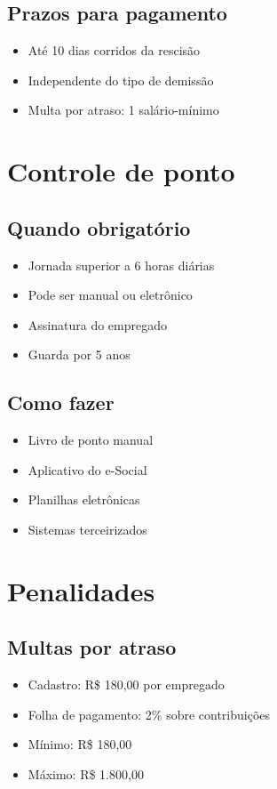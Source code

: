 \documentclass[12pt,a4paper]{article}
\begin{document}
\subsection{Prazos para pagamento}
\begin{itemize}
    \item Até 10 dias corridos da rescisão
    \item Independente do tipo de demissão
    \item Multa por atraso: 1 salário-mínimo
\end{itemize}

\section{Controle de ponto}

\subsection{Quando obrigatório}
\begin{itemize}
    \item Jornada superior a 6 horas diárias
    \item Pode ser manual ou eletrônico
    \item Assinatura do empregado
    \item Guarda por 5 anos
\end{itemize}

\subsection{Como fazer}
\begin{itemize}
    \item Livro de ponto manual
    \item Aplicativo do e-Social
    \item Planilhas eletrônicas
    \item Sistemas terceirizados
\end{itemize}

\section{Penalidades}

\subsection{Multas por atraso}
\begin{itemize}
    \item Cadastro: R\$ 180,00 por empregado
    \item Folha de pagamento: 2\% sobre contribuições
    \item Mínimo: R\$ 180,00
    \item Máximo: R\$ 1.800,00
\end{itemize}
\end{document}

